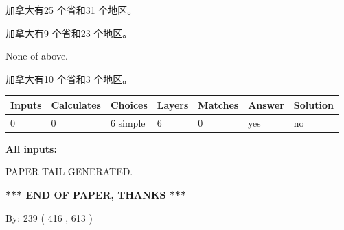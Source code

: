 \documentclass{ctexart}
\begin{document}
 
加拿大有25 个省和31 个地区。
 
 
加拿大有9 个省和23 个地区。
 
 
 None of above.
 
 
\noindent{}
 
 
加拿大有10 个省和3 个地区。
 
 
\noindent{}
 
 
   
   
   
   
\noindent\begin{tabular}{|l|l|l|l|l|l|l|}
 \hline
Inputs & Calculates & Choices & Layers & Matches & Answer & Solution \\ \hline
 0  & 
 0  & 
 6
  simple  
  & 
 6  & 
 0  & 
  yes & 
  no 
  \\ \hline
 \end{tabular}
   
   
   
   
\noindent{}
   
   
   
   
\noindent\vspace{0.1in}\hspace{-0.08in} {\textbf{\Large{All inputs: }}}
   
   
   
   
   
   
 \vspace{0.2in}
 
   
   
\vspace{2.0in} PAPER TAIL GENERATED.
   
   
   
   
\vspace{1.0in} 
{\textbf{\large{ *** END OF PAPER, THANKS *** }}} 
   
   
\hspace{1.0in} By: 
 239 ( 416 ,  613 )
   
   
   
   
\newpage 
\setcounter{page}{ 
   553001 } 
   
   
   
\end{document}
